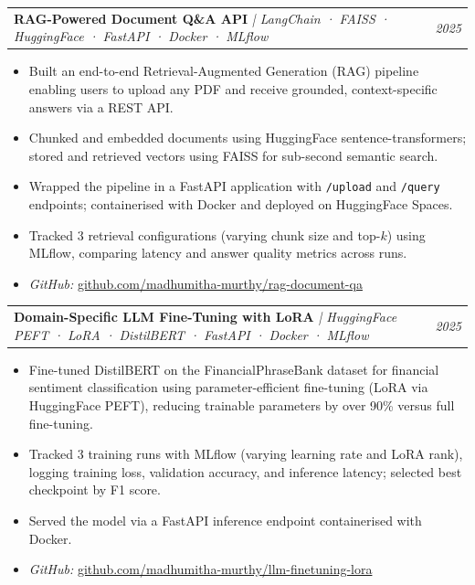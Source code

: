 \documentclass[10pt, a4paper]{article}
\makeatletter
\newcommand{\projentry}[3]{%
    \noindent
    \begin{tabularx}{\textwidth}{@{}X r@{}}
        \textbf{#1} \textit{\small | #2} & \textit{#3}
    \end{tabularx}%
    \vspace{1pt}%
}
\newcommand{\entryspace}{\vspace{6pt}}
\makeatother
\begin{document}
\projentry{RAG-Powered Document Q\&A API}{LangChain · FAISS · HuggingFace · FastAPI · Docker · MLflow}{2025}
\begin{itemize}
    \item Built an end-to-end Retrieval-Augmented Generation (RAG) pipeline enabling users to upload any PDF and receive grounded, context-specific answers via a REST API.
    \item Chunked and embedded documents using HuggingFace sentence-transformers; stored and retrieved vectors using FAISS for sub-second semantic search.
    \item Wrapped the pipeline in a FastAPI application with \texttt{/upload} and \texttt{/query} endpoints; containerised with Docker and deployed on HuggingFace Spaces.
    \item Tracked 3 retrieval configurations (varying chunk size and top-$k$) using MLflow, comparing latency and answer quality metrics across runs.
    \item \textit{GitHub:} \href{https://github.com/madhumitha-murthy/rag-document-qa}{github.com/madhumitha-murthy/rag-document-qa}
\end{itemize}

\entryspace

\projentry{Domain-Specific LLM Fine-Tuning with LoRA}{HuggingFace PEFT · LoRA · DistilBERT · FastAPI · Docker · MLflow}{2025}
\begin{itemize}
    \item Fine-tuned DistilBERT on the FinancialPhraseBank dataset for financial sentiment classification using parameter-efficient fine-tuning (LoRA via HuggingFace PEFT), reducing trainable parameters by over 90\% versus full fine-tuning.
    \item Tracked 3 training runs with MLflow (varying learning rate and LoRA rank), logging training loss, validation accuracy, and inference latency; selected best checkpoint by F1 score.
    \item Served the model via a FastAPI inference endpoint containerised with Docker.
    \item \textit{GitHub:} \href{https://github.com/madhumitha-murthy/llm-finetuning-lora}{github.com/madhumitha-murthy/llm-finetuning-lora}
\end{itemize}

\entryspace
\end{document}
